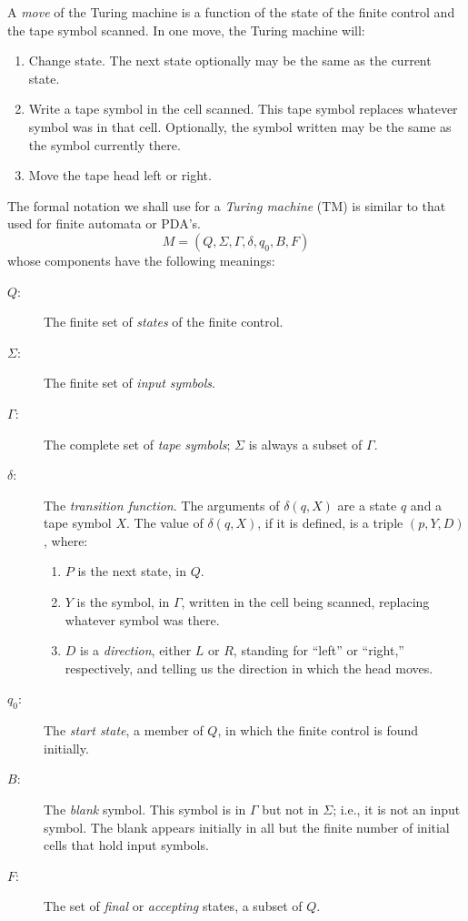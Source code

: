 \documentclass[]{article}
\begin{document}
A \emph{move} of the Turing machine is a function of the state of the 
finite control and the tape symbol scanned. In one move, the Turing machine 
will:
\begin{enumerate}
\item Change state. The next state optionally may be the same as the
current state.
\item Write a tape symbol in the cell scanned. This tape symbol 
replaces whatever symbol was in that cell. Optionally, the symbol 
written may be the same as the symbol currently there.
\item Move the tape head left or right.
\end{enumerate}

The formal notation we shall use for a \emph{Turing machine} (TM) is 
similar to that used for finite automata or PDA's.
\[ M = (Q,\Sigma,\Gamma,\delta,q_0,B,F) \]
whose components have the following meanings:
\begin{description}
\item[$Q$:] The finite set of \emph{states} of the finite control.
\item[$\Sigma$:] The finite set of \emph{input symbols}.
\item[$\Gamma$:] The complete set of \emph{tape symbols}; $\Sigma$ is 
always a subset of $\Gamma$.
\item[$\delta$:] The \emph{transition function}. The arguments of 
$\delta(q,X)$ are a state $q$ and a tape symbol $X$. The value of
$\delta(q,X)$, if it is defined, is a triple $(p,Y,D)$, where:
\begin{enumerate}
\item $P$ is the next state, in $Q$.
\item $Y$ is the symbol, in $\Gamma$, written in the cell being 
scanned, replacing whatever symbol was there.
\item $D$ is a \emph{direction}, either $L$ or $R$, standing for 
``left'' or ``right,'' respectively, and telling us the direction 
in which the head moves.
\end{enumerate}
\item[$q_0$:] The \emph{start state}, a member of $Q$, in which the 
finite control is found initially.
\item[$B$:] The \emph{blank} symbol. This symbol is in $\Gamma$ but not 
in $\Sigma$; i.e., it is not an input symbol. The blank appears 
initially in all but the finite number of initial cells that hold input 
symbols.
\item[$F$:] The set of \emph{final} or \emph{accepting} states, a 
subset of $Q$.
\end{description}
\end{document}
